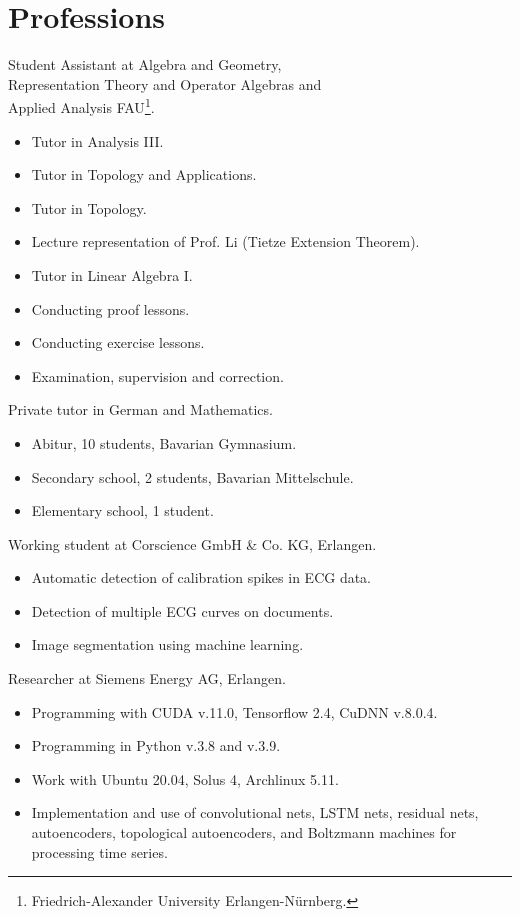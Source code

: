 \documentclass[a4paper, 12pt]{article}
\newcommand{\years}[1]{\marginnote{\scriptsize #1}}
\begin{document}
\section*{Professions}
\years{2023--25} Student Assistant at Algebra and Geometry, \\
	      Representation Theory and Operator Algebras and \\
	      Applied Analysis FAU\footnote{Friedrich-Alexander University Erlangen-Nürnberg.}.
\begin{itemize}
	\item Tutor in \glqq Analysis III\grqq.
	\item Tutor in \glqq Topology and Applications\grqq.
	\item Tutor in \glqq Topology\grqq.
	\item Lecture representation of Prof. Li (Tietze Extension Theorem).
	\item Tutor in \glqq Linear Algebra I\grqq.
	\item Conducting proof lessons.
	\item Conducting exercise lessons.
	\item Examination, supervision and correction.
\end{itemize}
\years{2024--25} Private tutor in German and Mathematics.
\begin{itemize}
	\item Abitur, 10 students, Bavarian Gymnasium.
	\item Secondary school, 2 students, Bavarian Mittelschule.
	\item Elementary school, 1 student.
\end{itemize}
\years{2021--22} Working student at Corscience GmbH \& Co. KG, Erlangen.
\begin{itemize}
	\item Automatic detection of calibration spikes in ECG data.
	\item Detection of multiple ECG curves on documents.
	\item Image segmentation using machine learning.
\end{itemize}
\years{2019--21} Researcher at Siemens Energy AG, Erlangen.
\begin{itemize}
	\item Programming with CUDA v.11.0, Tensorflow 2.4, CuDNN v.8.0.4.
	\item Programming in Python v.3.8 and v.3.9.
	\item Work with Ubuntu 20.04, Solus 4, Archlinux 5.11.
	\item Implementation and use of convolutional nets, LSTM nets, residual nets, autoencoders, topological autoencoders, and Boltzmann machines for processing time series.
\end{itemize}
\end{document}
